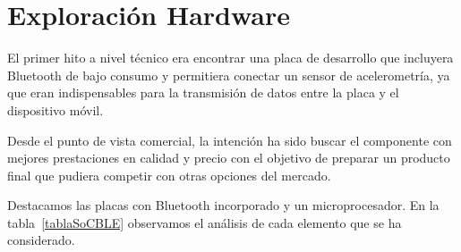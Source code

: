 
\cleardoublepage


\chapter{Exploración Hardware}
\label{makereference3}

El primer hito a nivel técnico era encontrar una placa de desarrollo que incluyera Bluetooth de bajo consumo y permitiera conectar un sensor de acelerometría, ya que eran indispensables para la transmisión de datos entre la placa y el dispositivo móvil. 

Desde el punto de vista comercial, la intención ha sido buscar el componente con mejores prestaciones en calidad y precio con el objetivo de preparar un producto final que pudiera competir con otras opciones del mercado.

Destacamos las placas con Bluetooth incorporado y un microprocesador. En la tabla~\ref{tablaSoCBLE} observamos el análisis de cada elemento que se ha considerado.

